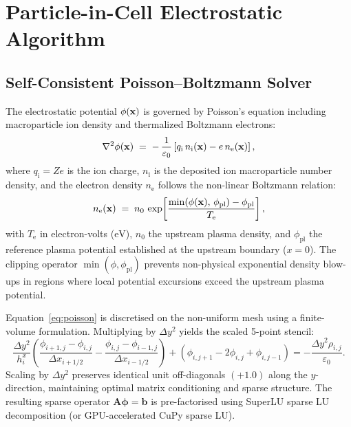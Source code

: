 \documentclass[11pt,a4paper]{article}
\begin{document}
\section{Particle-in-Cell Electrostatic Algorithm}

\subsection{Self-Consistent Poisson--Boltzmann Solver}

The electrostatic potential $\phi(\vb{x})$ is governed by Poisson's equation including macroparticle ion density and thermalized Boltzmann electrons:
\begin{equation}
    \nabla^{2}\phi(\vb{x}) \;=\; -\,\frac{1}{\varepsilon_{0}}
        \left[ q_{\mathrm{i}}\,n_{\mathrm{i}}(\vb{x}) - e\,n_{\mathrm{e}}(\vb{x}) \right],
    \label{eq:poisson}
\end{equation}
where $q_{\mathrm{i}} = Z e$ is the ion charge, $n_{\mathrm{i}}$ is the deposited ion macroparticle number density, and the electron density $n_{\mathrm{e}}$ follows the non-linear Boltzmann relation:
\begin{equation}
    n_{\mathrm{e}}(\vb{x}) \;=\; n_{0}\,
    \exp\!\left[\frac{\min(\phi(\vb{x}),\,\phi_{\mathrm{pl}}) - \phi_{\mathrm{pl}}}{T_{\mathrm{e}}}\right],
    \label{eq:boltzmann}
\end{equation}
with $T_{\mathrm{e}}$ in electron-volts ($\si{\eV}$), $n_0$ the upstream plasma density, and $\phi_{\mathrm{pl}}$ the reference plasma potential established at the upstream boundary ($x = 0$). The clipping operator $\min(\phi, \phi_{\mathrm{pl}})$ prevents non-physical exponential density blow-ups in regions where local potential excursions exceed the upstream plasma potential.

Equation~\eqref{eq:poisson} is discretised on the non-uniform mesh using a finite-volume formulation. Multiplying by $\Delta y^2$ yields the scaled 5-point stencil:
\begin{equation}
    \frac{\Delta y^2}{h_i^x} \left( \frac{\phi_{i+1,j} - \phi_{i,j}}{\Delta x_{i+1/2}} - \frac{\phi_{i,j} - \phi_{i-1,j}}{\Delta x_{i-1/2}} \right) +
    \left(\phi_{i,j+1} - 2\phi_{i,j} + \phi_{i,j-1}\right)
    = -\frac{\Delta y^2 \rho_{i,j}}{\varepsilon_{0}}.
\end{equation}
Scaling by $\Delta y^2$ preserves identical unit off-diagonals $(+1.0)$ along the $y$-direction, maintaining optimal matrix conditioning and sparse structure. The resulting sparse operator $\mathbf{A} \boldsymbol{\phi} = \mathbf{b}$ is pre-factorised using SuperLU sparse LU decomposition (or GPU-accelerated CuPy sparse LU).
\end{document}
